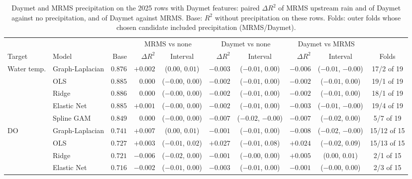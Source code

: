 \documentclass[11pt]{article}
\begin{document}
\begin{table}[h]
\centering
\small
\caption{Daymet and MRMS precipitation on the 2025 rows with Daymet features: paired $\Delta R^2$ of
MRMS upstream rain and of Daymet against no precipitation, and of Daymet against MRMS. Base: $R^2$
without precipitation on these rows. Folds: outer folds whose chosen candidate included precipitation
(MRMS/Daymet).}
\label{tab:daymet}
\scriptsize
\setlength{\tabcolsep}{2.2pt}
\begin{tabular}{ll r rc rc rc c}
\toprule
 & & & \multicolumn{2}{c}{MRMS vs none} & \multicolumn{2}{c}{Daymet vs none} & \multicolumn{2}{c}{Daymet vs MRMS} & \\
\cmidrule(lr){4-5}\cmidrule(lr){6-7}\cmidrule(lr){8-9}
Target & Model & Base & $\Delta R^2$ & Interval & $\Delta R^2$ & Interval & $\Delta R^2$ & Interval & Folds \\
\midrule
Water temp.   & Graph-Laplacian & $0.876$ & $\mathbf{+0.002}$ & ($0.00$, $0.01$) & $-0.003$ & ($-0.01$, $0.00$) & $\mathbf{-0.006}$ & ($-0.01$, $-0.00$) & 17/2 of 19 \\
              & OLS             & $0.885$ & $0.000$ & ($-0.00$, $0.00$) & $-0.002$ & ($-0.01$, $0.00$) & $-0.002$ & ($-0.01$, $0.00$) & 19/1 of 19 \\
              & Ridge           & $0.886$ & $0.000$ & ($-0.00$, $0.00$) & $-0.002$ & ($-0.01$, $0.00$) & $-0.002$ & ($-0.01$, $0.00$) & 18/1 of 19 \\
              & Elastic Net     & $0.885$ & $+0.001$ & ($-0.00$, $0.00$) & $-0.002$ & ($-0.01$, $0.00$) & $\mathbf{-0.003}$ & ($-0.01$, $-0.00$) & 19/4 of 19 \\
              & Spline GAM      & $0.849$ & $0.000$ & ($-0.00$, $0.00$) & $\mathbf{-0.007}$ & ($-0.02$, $-0.00$) & $-0.007$ & ($-0.02$, $0.00$) & 5/7 of 19 \\
\addlinespace
DO            & Graph-Laplacian & $0.741$ & $\mathbf{+0.007}$ & ($0.00$, $0.01$) & $-0.001$ & ($-0.01$, $0.00$) & $\mathbf{-0.008}$ & ($-0.02$, $-0.00$) & 15/12 of 15 \\
              & OLS             & $0.727$ & $+0.003$ & ($-0.01$, $0.02$) & $+0.027$ & ($-0.01$, $0.08$) & $+0.024$ & ($-0.02$, $0.09$) & 15/13 of 15 \\
              & Ridge           & $0.721$ & $-0.006$ & ($-0.02$, $0.00$) & $-0.001$ & ($-0.00$, $0.00$) & $+0.005$ & ($0.00$, $0.01$) & 2/1 of 15 \\
              & Elastic Net     & $0.716$ & $-0.002$ & ($-0.01$, $0.00$) & $-0.003$ & ($-0.01$, $0.00$) & $-0.001$ & ($-0.00$, $0.00$) & 2/3 of 15 \\

\end{tabular}
\end{table}
\end{document}
